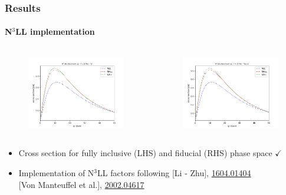 \documentclass[aspectratio=43]{beamer}
\begin{document}
\begin{frame}
	
	\frametitle{Results}
	\framesubtitle{N$^{3}$LL implementation}
	
	\footnotesize
	
	\begin{columns}
		
		
		\begin{figure}
			\includegraphics[width = 6cm]{plots/part3/chapter7/hturbo_n3ll.png}
		\end{figure}
		
		
		\begin{figure}
			\includegraphics[width = 6cm]{plots/part3/chapter7/hturbo_n3ll_cuts.png}
		\end{figure}
		
	\end{columns}
	
	\begin{itemize}
		\item Cross section for fully inclusive (LHS) and fiducial (RHS) phase space {\color{darkgreen}$\checkmark$} 
		\item Implementation of N$^{3}$LL factors following
		{\color{blue}[Li - Zhu]}, {\color{blue} \href{https://arxiv.org/abs/1604.01404}{1604.01404}} \\
		{\color{blue}[Von Manteuffel et al.]}, {\color{blue} \href{https://arxiv.org/abs/2002.04617}{2002.04617}}
	\end{itemize}

\end{frame}
\end{document}
